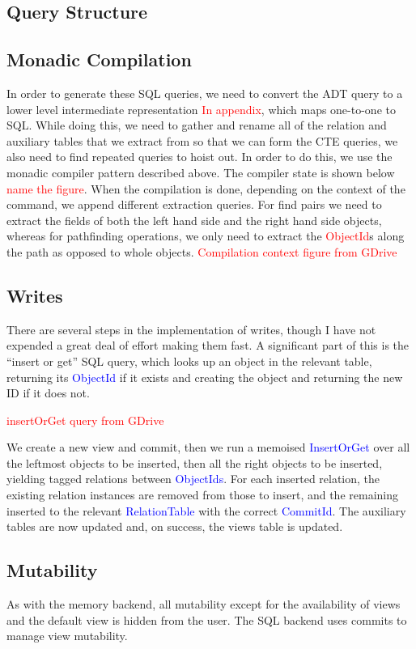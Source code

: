 \documentclass[12pt,a4paper,twoside,openright]{report}
\newcommand\todo[1]{\textcolor{red}{#1}}
\newcommand\codeName[1]{\textcolor{blue}{#1}}
\begin{document}
	\subsection{Query Structure}
	\subsection{Monadic Compilation}
	In order to generate these SQL queries, we need to convert the ADT query to a lower level intermediate representation \todo{In appendix}, which maps one-to-one to SQL. While doing this, we need to gather and rename all of the relation and auxiliary tables that we extract from so that we can form the CTE queries, we also need to find repeated queries to hoist out. In order to do this, we use the monadic compiler pattern described above. The compiler state is shown below \todo{name the figure}. When the compilation is done, depending on the context of the command, we append different extraction queries. For find pairs we need to extract the fields of both the left hand side and the right hand side objects, whereas for pathfinding operations, we only need to extract the \todo{ObjectId}s along the path as opposed to whole  objects. \todo{Compilation context figure from GDrive}

	\subsection{Writes}
	There are several steps in the implementation of writes, though I have not expended  a great deal of effort making them fast. A significant part of this is the “insert or get” SQL query, which looks up an object in the relevant table, returning its \codeName{ObjectId} if it exists and creating the object and returning the new ID if it does not.
	
	\todo{insertOrGet query from GDrive}
	
	We create a new view and commit, then we run a memoised \codeName{InsertOrGet} over all the leftmost objects to be inserted, then all the right objects to be inserted, yielding tagged relations between \codeName{ObjectIds}. For each inserted relation, the existing relation instances are removed from those to insert, and the remaining inserted to the relevant \codeName{RelationTable} with the correct \codeName{CommitId}. The auxiliary tables are now updated and, on success, the views table is updated.

	\subsection{Mutability}
	As with the memory backend, all mutability except for the availability of views and the default view is hidden from the user. The SQL backend uses commits to manage view mutability.
\end{document}
